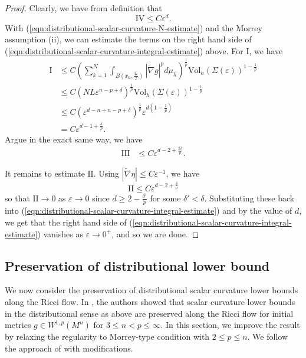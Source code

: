 \documentclass[12pt]{amsart}
\def\e{\varepsilon}
\theoremstyle{plain}
\theoremstyle{plain}
\theoremstyle{definition}
\theoremstyle{remark}
\numberwithin{equation}{subsection}
\newcommand{\hdel}{\tilde{\nabla}}
\begin{document}
\begin{proof}
Clearly, we have from definition that
 \begin{equation*}
        \text{IV} \leq C\varepsilon^d.
    \end{equation*}
    With (\ref{eqn:distributional-scalar-curvature-N-estimate}) and the Morrey assumption (ii), we can estimate the terms on the right hand side of (\ref{eqn:distributional-scalar-curvature-integral-estimate}) above. For I, we have
    \begin{align*}
        \text{I} &\leq C\left(\sum\limits_{k=1}^N \int_{B(x_k,\frac{3\varepsilon}{2})}|\hdel g|^pd\mu_h\right)^\frac{1}{p}\text{Vol}_h(\Sigma(\varepsilon))^{1-\frac{1}{p}} \nonumber \\
        &\leq C\left(NL\varepsilon^{n-p+\delta}\right)^\frac{1}{p}\text{Vol}_h(\Sigma(\varepsilon))^{1-\frac{1}{p}} \nonumber \\
        &\leq C(\varepsilon^{d-n+n-p+\delta})^\frac{1}{p}\varepsilon^{d\left(1-\frac{1}{p}\right)} \nonumber \\
        &= C\varepsilon^{d-1+\frac{\delta}{p}}.
    \end{align*} 
Argue in the exact same way, we have 
    \begin{align*}
        \text{III} &\leq C\varepsilon^{d-2+\frac{2\delta}{p}}.
    \end{align*}

It remains to estimate $\text{II}$. Using $|\hdel \eta|\leq C\e^{-1}$, we have 
\begin{equation}
\text{II}\leq C\e^{d-2+\frac{\delta}{p}}
\end{equation}
so that $\text{II}\to0$ as $\e\to 0$ since $d\geq 2-\frac{\delta'}{p}$ for some $\delta'<\delta$.    Substituting these back into (\ref{eqn:distributional-scalar-curvature-integral-estimate}) and by the value of $d$, we get that the right hand side of (\ref{eqn:distributional-scalar-curvature-integral-estimate}) vanishes as $\varepsilon\to0^+$, and so we are done.
\end{proof}

\subsection{Preservation of distributional lower bound}

We now consider the preservation of distributional scalar curvature lower bounds along the Ricci flow. In \cite{jiang_weak_2021}, the authors showed that scalar curvature lower bounds in the distributional sense as above are preserved along the Ricci flow for initial metrics $g \in W^{1,p}(M^n)$ for $3 \leq n < p \leq \infty$. In this section, we improve the result by relaxing the regularity to Morrey-type condition with $2 \leq p \leq n$. We follow the approach of \cite{jiang_weak_2021} with modifications.
\end{document}
